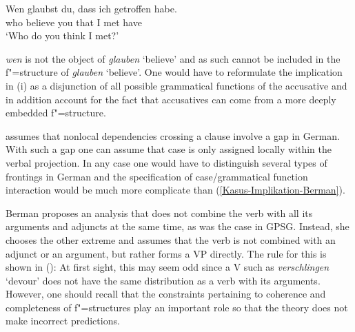 {{\ea
\gll Wen glaubst du, dass ich getroffen habe.\\
	 who believe you that I met have\\
\glt `Who do you think I met?'
\z

\noindent
\emph{wen} is not the object of \emph{glauben} `believe' and as such cannot be included in the
f"=structure of \emph{glauben} `believe'. One would have to reformulate the implication in
(i) as a disjunction of all possible grammatical functions of the accusative and in addition account
for the fact that accusatives can come from a more deeply embedded f"=structure.

\citet[]{Bresnan2001a} assumes that nonlocal dependencies crossing a clause involve a gap
in German. With such a gap one can assume that case is only assigned locally within the verbal
projection. In any case one would have to distinguish several types of frontings in German and the
specification of case/grammatical function interaction would be much more complicate than (\ref{Kasus-Implikation-Berman}).%
%
}
\ea
\label{le-verschlingen}
\z

\largerpage
\noindent
Berman proposes an analysis that does not combine the verb with all its arguments and adjuncts at
the same time, as was the case in GPSG\indexgpsg. Instead, she chooses the other extreme and assumes
that the verb is not combined with an adjunct or an argument, but rather forms a VP directly. The rule for this is shown in ():
\ea
\label{LFG-v-vp}
\z
At first sight, this may seem odd since a V such as \emph{verschlingen} `devour' does not have the same distribution as a verb with its arguments. However, one should recall that the
constraints pertaining to coherence and completeness of f"=structures play an important role so that
the theory does not make incorrect predictions.
}%

